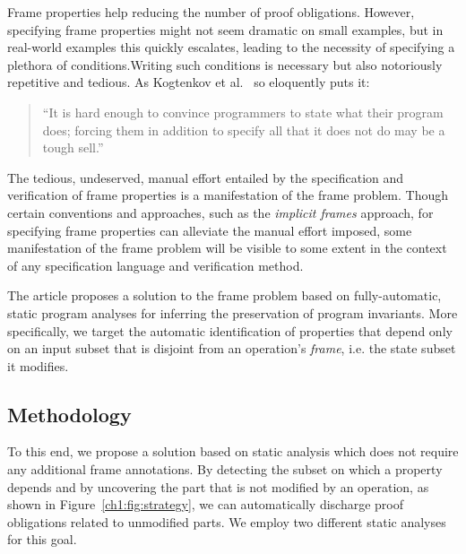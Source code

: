 \documentclass[11pt]{article}
\begin{document}
Frame properties help reducing the number of proof
obligations. However, specifying frame properties might not seem dramatic
on small examples, but in real-world examples this quickly
escalates, leading to the necessity of specifying a plethora of
conditions.Writing such conditions is necessary but also notoriously
repetitive and tedious.  As Kogtenkov et al.~\cite{kogtenkov15}
so eloquently puts it:

\begin{quotation}
``It is hard enough to convince  programmers to state what their program does; forcing 
them in addition to specify all that it does not do may be a tough sell.'' 
\end{quotation}

The tedious, undeserved, manual effort entailed by the specification and
verification of frame properties is a manifestation of the frame problem. Though
certain conventions and approaches, such as the \emph{implicit frames} approach,
for specifying frame properties can alleviate the manual effort imposed, some
manifestation of the frame problem will be visible to some extent in the context
of any specification language and verification method.

The article proposes a solution to the frame problem based on
fully-automatic, static program analyses for inferring the
preservation of program invariants. More specifically, we target the
automatic identification of properties that depend only on an input
subset that is disjoint from an operation's \emph{frame}, i.e. the
state subset it modifies.

\subsection{Methodology}

To this end, we propose a solution based on static analysis which does not
require any additional frame annotations. By detecting the subset
on which a property depends and by uncovering the part that is not modified by
an operation, as shown in Figure~\ref{ch1:fig:strategy}, we can automatically
discharge proof obligations related to unmodified parts. We employ two different
static analyses for this goal.
\end{document}
